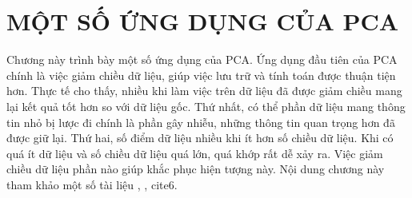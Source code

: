 \setcounter{chapter}{2}
\chapter{MỘT SỐ ỨNG DỤNG CỦA PCA}
\indent Chương này trình bày một số ứng dụng của PCA. Ứng dụng đầu tiên của PCA chính là việc giảm chiều dữ liệu, giúp
việc lưu trữ và tính toán được thuận tiện hơn. Thực tế cho thấy, nhiều khi làm
việc trên dữ liệu đã được giảm chiều mang lại kết quả tốt hơn so với dữ liệu
gốc. Thứ nhất, có thể phần dữ liệu mang thông tin nhỏ bị lược đi chính là phần
gây nhiễu, những thông tin quan trọng hơn đã được giữ lại. Thứ hai, số điểm dữ
liệu nhiều khi ít hơn số chiều dữ liệu. Khi có quá ít dữ liệu và số chiều dữ
liệu quá lớn, quá khớp rất dễ xảy ra. Việc giảm chiều dữ liệu phần nào giúp
khắc phục hiện tượng này. Nội dung chương này tham khảo một số tài liệu \cite{4}, \cite{5}, cite{6}.
